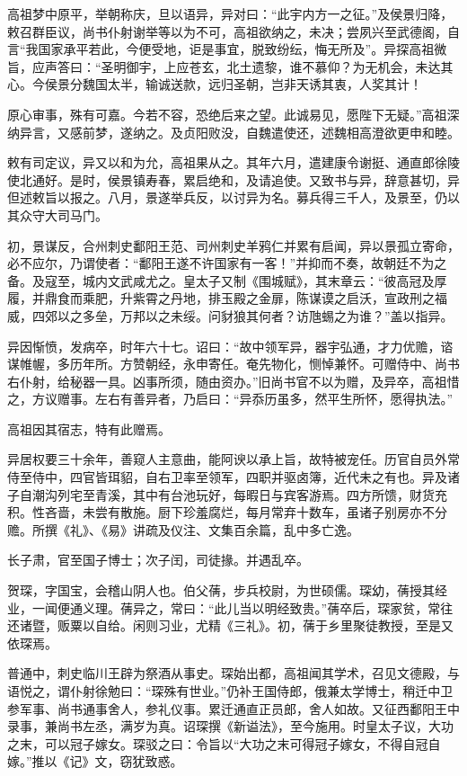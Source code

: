 \documentclass[12pt,UTF8]{ctexbook}
\begin{document}
高祖梦中原平，举朝称庆，旦以语异，异对曰：“此宇内方一之征。”及侯景归降，敕召群臣议，尚书仆射谢举等以为不可，高祖欲纳之，未决；尝夙兴至武德阁，自言“我国家承平若此，今便受地，讵是事宜，脱致纷纭，悔无所及”。异探高祖微旨，应声答曰：“圣明御宇，上应苍玄，北土遗黎，谁不慕仰？为无机会，未达其心。今侯景分魏国太半，输诚送款，远归圣朝，岂非天诱其衷，人奖其计！

原心审事，殊有可嘉。今若不容，恐绝后来之望。此诚易见，愿陛下无疑。”高祖深纳异言，又感前梦，遂纳之。及贞阳败没，自魏遣使还，述魏相高澄欲更申和睦。

敕有司定议，异又以和为允，高祖果从之。其年六月，遣建康令谢挺、通直郎徐陵使北通好。是时，侯景镇寿春，累启绝和，及请追使。又致书与异，辞意甚切，异但述敕旨以报之。八月，景遂举兵反，以讨异为名。募兵得三千人，及景至，仍以其众守大司马门。

初，景谋反，合州刺史鄱阳王范、司州刺史羊鸦仁并累有启闻，异以景孤立寄命，必不应尔，乃谓使者：“鄱阳王遂不许国家有一客！”并抑而不奏，故朝廷不为之备。及寇至，城内文武咸尤之。皇太子又制《围城赋》，其末章云：“彼高冠及厚履，并鼎食而乘肥，升紫霄之丹地，排玉殿之金扉，陈谋谟之启沃，宣政刑之福威，四郊以之多垒，万邦以之未绥。问豺狼其何者？访虺蜴之为谁？”盖以指异。

异因惭愤，发病卒，时年六十七。诏曰：“故中领军异，器宇弘通，才力优赡，谘谋帷幄，多历年所。方赞朝经，永申寄任。奄先物化，恻悼兼怀。可赠侍中、尚书右仆射，给秘器一具。凶事所须，随由资办。”旧尚书官不以为赠，及异卒，高祖惜之，方议赠事。左右有善异者，乃启曰：“异忝历虽多，然平生所怀，愿得执法。”

高祖因其宿志，特有此赠焉。

异居权要三十余年，善窥人主意曲，能阿谀以承上旨，故特被宠任。历官自员外常侍至侍中，四官皆珥貂，自右卫率至领军，四职并驱卤簿，近代未之有也。异及诸子自潮沟列宅至青溪，其中有台池玩好，每暇日与宾客游焉。四方所馈，财货充积。性吝啬，未尝有散施。厨下珍羞腐烂，每月常弃十数车，虽诸子别房亦不分赡。所撰《礼》、《易》讲疏及仪注、文集百余篇，乱中多亡逸。

长子肃，官至国子博士；次子闰，司徒掾。并遇乱卒。

贺琛，字国宝，会稽山阴人也。伯父蒨，步兵校尉，为世硕儒。琛幼，蒨授其经业，一闻便通义理。蒨异之，常曰：“此儿当以明经致贵。”蒨卒后，琛家贫，常往还诸暨，贩粟以自给。闲则习业，尤精《三礼》。初，蒨于乡里聚徒教授，至是又依琛焉。

普通中，刺史临川王辟为祭酒从事史。琛始出都，高祖闻其学术，召见文德殿，与语悦之，谓仆射徐勉曰：“琛殊有世业。”仍补王国侍郎，俄兼太学博士，稍迁中卫参军事、尚书通事舍人，参礼仪事。累迁通直正员郎，舍人如故。又征西鄱阳王中录事，兼尚书左丞，满岁为真。诏琛撰《新谥法》，至今施用。时皇太子议，大功之末，可以冠子嫁女。琛驳之曰：令旨以“大功之末可得冠子嫁女，不得自冠自嫁。”推以《记》文，窃犹致惑。
\end{document}
